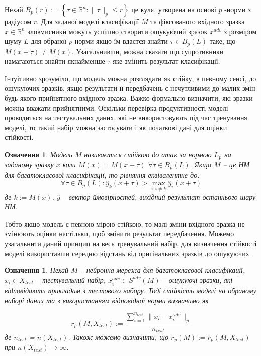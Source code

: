 \documentclass[14pt,a4paper]{extarticle}
\newcounter{e}
\newtheorem{defn}[theorem]{Означення}
\numberwithin{equation}{section}
\numberwithin{figure}{section}
\begin{document}
 Нехай $B_{p}(r):=\left\{\tau \in \mathbb{R}^{n}:\|\tau\|_{p} \leq r\right\}$ це куля, утворена на основі $p$ -норми з радіусом $r$. Для заданої моделі класифікації $M$ та фіксованого вхідного зразка $x \in \mathbb{R}^{n}$ зловмисники можуть успішно створити ошукуючий зразок $x^{adv}$ з розміром шуму $L$ для обраної $p$-норми якщо їм вдастся знайти $\tau \in B_{p}(L)$ таке, що $M(x+\tau) \neq M(x)$. Узагальнивши, можна сказати що супротивники намагаються знайти якнайменше $\tau$ яке змінить результат класифікації.
 
 Інтуітивно зрозуміло, що модель можна розглядати як стійку, в певному сенсі, до ошукуючих зразків, якщо результати її передбачень є нечутливими до малих змін будь-якого прийнятного вхідного зразка. Важко формально визначити, які зразки можна вважати прийнятними. Оскільки перевірка продуктивності моделі проводиться на тестувальних даних, які не використовують під час тренування моделі, то такий набір можна застосувати і як початкові дані для оцінки стійкості.
 
 \begin{defn}
 Модель $M$ називається стійкою до атак за нормою $L_p$ на заданому зразку $x$ коли $M(x)=M(x+\tau)$ $\forall \tau \in B_{p}(L) .$ Якщо $M$ -- це НМ для багатокласової класифікації, то рівняння еквівалентне до:
 \begin{equation}
 \forall \tau \in B_{p}(L): \hat{y}_{k}(x+\tau)>\max _{i: i \neq k} \hat{y}_{i}(x+\tau)
 \end{equation}
 де $k:=M(x)$, $\hat{y}$ -- вектор ймовірностей, вихідний результат останнього шару НМ.
 \end{defn}
 
 Тобто якщо модель є певною мірою стійкою, то малі зміни вхідного зразка не змінюють оцінки настільки, щоб змінити результат передбачення. Можемо узагальнити даний принцип на весь тренувальний набір, для визначення стійкості моделі використавши середню відстань від оригінальних зразків до ошукуючих.
 
 \begin{defn}
 Нехай $M$ -- нейронна мережа для багатокласової класифікації, $x_i \in X_{test}$ -- тестувальний набір, $x^{adv}_i \in S^{adv}(M)$ -- ошукуючі зразки, які відповідають прикладам з тестового набору. Тоді стійкість моделі на обраному наборі даних та з використанням відповідної норми визначимо як
 
 \begin{equation}
 r_p(M, X_{test}) := \frac{\sum\limits^{n_{test}}_{i = 1}\|x_i-x^{adv}_i\|_{p}}{n_{test}}
 \end{equation}
 де $n_{test}$ = $n(X_{test})$. Також можемо визначити, що $r_p(M) := r_p(M, X_{test})$ при $ n(X_{test}) \to \infty$.
 
 \end{defn}
 
\end{document}
